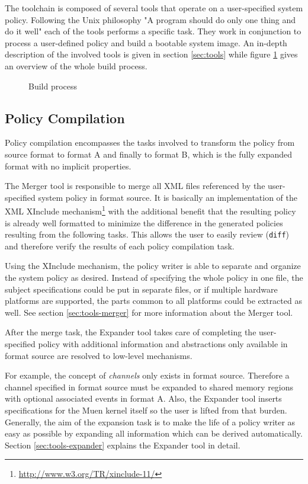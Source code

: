 \documentclass[a4paper,twoside,titlepage]{article}
\begin{document}
The toolchain is composed of several tools that operate on a user-specified
system policy. Following the Unix philosophy "A program should do only one thing
and do it well" each of the tools performs a specific task. They work in
conjunction to process a user-defined policy and build a bootable system image.
An in-depth description of the involved tools is given in section
\ref{sec:tools} while figure \ref{fig:build-process} gives an overview of the
whole build process.

\begin{figure}[h]
	\centering
	
	\caption{Build process}
	\label{fig:build-process}
\end{figure}

\subsection{Policy Compilation}
\label{sec:build-policy_compilation}
Policy compilation encompasses the tasks involved to transform the policy from
source format to format A and finally to format B, which is the fully expanded
format with no implicit properties.

The Merger tool is responsible to merge all XML files referenced by the
user-specified system policy in format source. It is basically an implementation
of the XML XInclude mechanism\footnote{\url{http://www.w3.org/TR/xinclude-11/}}
with the additional benefit that the resulting policy is already well formatted
to minimize the difference in the generated policies resulting from the
following tasks.  This allows the user to easily review (\texttt{diff}) and
therefore verify the results of each policy compilation task.

Using the XInclude mechanism, the policy writer is able to separate and organize
the system policy as desired. Instead of specifying the whole policy in one
file, the subject specifications could be put in separate files, or if multiple
hardware platforms are supported, the parts common to all platforms could be
extracted as well. See section \ref{sec:tools-merger} for more information about
the Merger tool.

After the merge task, the Expander tool takes care of completing the
user-specified policy with additional information and abstractions only
available in format source are resolved to low-level mechanisms.

For example, the concept of \emph{channels} only exists in format source.
Therefore a channel specified in format source must be expanded to shared memory
regions with optional associated events in format A.  Also, the Expander tool
inserts specifications for the Muen kernel itself so the user is lifted from
that burden. Generally, the aim of the expansion task is to make the life of a
policy writer as easy as possible by expanding all information which can be
derived automatically. Section \ref{sec:tools-expander} explains the Expander
tool in detail.
\end{document}
